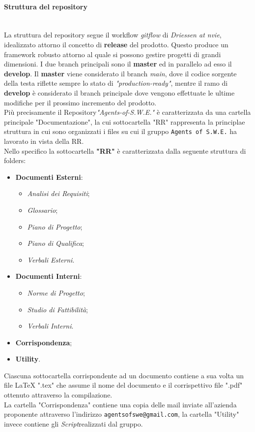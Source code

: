 \paragraph{Struttura del repository} \-\\ 
La struttura del repository segue il workflow \textit{gitflow} di \textit{Driessen at nvie}, idealizzato attorno il concetto di \textbf{release} del prodotto. Questo produce un framework robusto attorno al quale si possono gestire progetti di grandi dimensioni. I due branch principali sono il \textbf{master} ed in parallelo ad esso il \textbf{develop}. 
Il \textbf{master} viene considerato il branch \textit{main}, dove il codice sorgente della testa riflette sempre lo stato di \textit{"production-ready"},
mentre il ramo di \textbf{develop} è considerato il branch principale dove vengono effettuate le ultime modifiche per il prossimo incremento del prodotto. ~\\
Più precisamente il Repository\glossario \textit{"Agents-of-S.W.E."} è caratterizzata da una cartella principale "Documentazione", la cui sottocartella "RR" rappresenta la principlae struttura in cui sono organizzati i files su cui il gruppo \texttt{Agents of S.W.E.} ha lavorato in vista della RR.\\
	Nello specifico la sottocartella \textbf{"RR"} è caratterizzata dalla seguente struttura di folders:
	\begin{itemize}
	\item \textbf{Documenti Esterni}:
		\begin{itemize}
		\item \textit{Analisi dei Requisiti};
		\item \textit{Glossario};
		\item \textit{Piano di Progetto};
		\item \textit{Piano di Qualifica};
		\item \textit{Verbali Esterni}.
		\end{itemize}
	\item \textbf{Documenti Interni}:
		\begin{itemize}
		\item \textit{Norme di Progetto};
		\item \textit{Studio di Fattibilità};
		\item \textit{Verbali Interni}.
		\end{itemize}
	\item \textbf{Corrispondenza};
	\item \textbf{Utility}.
	\end{itemize}
	Ciascuna sottocartella corrispondente ad un documento contiene a sua volta un file LaTeX ".tex" che assume il nome del documento e il corrispettivo file ".pdf" ottenuto attraverso la compilazione.\\
	La cartella "Corrispondenza" contiene una copia delle mail inviate all'azienda proponente attraverso l'indirizzo \texttt{agentsofswe@gmail.com}, la cartella "Utility" invece contiene gli \textit{Script}\glossario realizzati dal gruppo.

